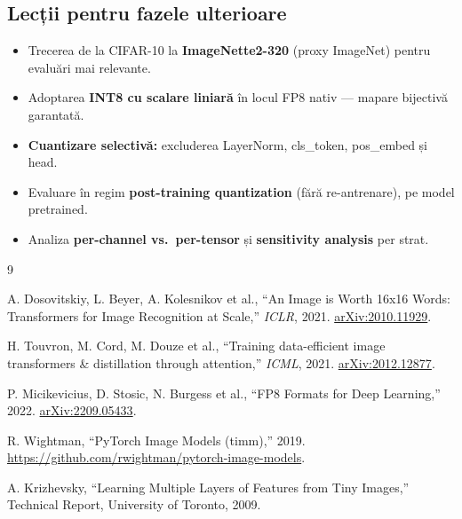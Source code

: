 \documentclass[12pt,a4paper]{article}
\begin{document}
\subsection{Lecții pentru fazele ulterioare}

\begin{itemize}
  \item Trecerea de la CIFAR-10 la \textbf{ImageNette2-320} (proxy ImageNet)
    pentru evaluări mai relevante.
  \item Adoptarea \textbf{INT8 cu scalare liniară} în locul FP8 nativ --- mapare
    bijectivă garantată.
  \item \textbf{Cuantizare selectivă:} excluderea LayerNorm, cls\_token,
    pos\_embed și head.
  \item Evaluare în regim \textbf{post-training quantization} (fără
    re-antrenare), pe model pretrained.
  \item Analiza \textbf{per-channel vs.\ per-tensor} și \textbf{sensitivity
    analysis} per strat.
\end{itemize}

\begin{thebibliography}{9}

A. Dosovitskiy, L. Beyer, A. Kolesnikov et al.,
``An Image is Worth 16x16 Words: Transformers for Image Recognition at Scale,''
\emph{ICLR}, 2021. \href{https://arxiv.org/abs/2010.11929}{arXiv:2010.11929}.

H. Touvron, M. Cord, M. Douze et al.,
``Training data-efficient image transformers \& distillation through attention,''
\emph{ICML}, 2021. \href{https://arxiv.org/abs/2012.12877}{arXiv:2012.12877}.

P. Micikevicius, D. Stosic, N. Burgess et al.,
``FP8 Formats for Deep Learning,''
2022. \href{https://arxiv.org/abs/2209.05433}{arXiv:2209.05433}.

R. Wightman, ``PyTorch Image Models (timm),'' 2019.
\url{https://github.com/rwightman/pytorch-image-models}.

A. Krizhevsky, ``Learning Multiple Layers of Features from Tiny Images,''
Technical Report, University of Toronto, 2009.

\end{thebibliography}
\end{document}

